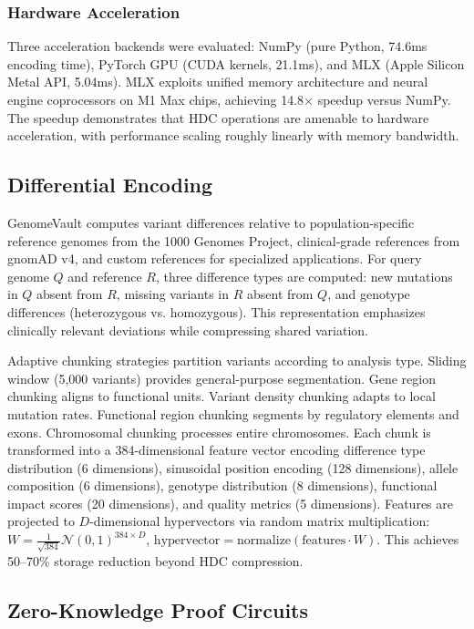 \documentclass[11pt,letterpaper]{article}
\begin{document}
\subsubsection{Hardware Acceleration}

Three acceleration backends were evaluated: NumPy (pure Python, 74.6ms encoding time), PyTorch GPU (CUDA kernels, 21.1ms), and MLX (Apple Silicon Metal API, 5.04ms). MLX exploits unified memory architecture and neural engine coprocessors on M1 Max chips, achieving 14.8$\times$ speedup versus NumPy. The speedup demonstrates that HDC operations are amenable to hardware acceleration, with performance scaling roughly linearly with memory bandwidth.

\subsection{Differential Encoding}

GenomeVault computes variant differences relative to population-specific reference genomes from the 1000 Genomes Project, clinical-grade references from gnomAD v4, and custom references for specialized applications. For query genome $Q$ and reference $R$, three difference types are computed: new mutations in $Q$ absent from $R$, missing variants in $R$ absent from $Q$, and genotype differences (heterozygous vs. homozygous). This representation emphasizes clinically relevant deviations while compressing shared variation.

Adaptive chunking strategies partition variants according to analysis type. Sliding window (5,000 variants) provides general-purpose segmentation. Gene region chunking aligns to functional units. Variant density chunking adapts to local mutation rates. Functional region chunking segments by regulatory elements and exons. Chromosomal chunking processes entire chromosomes. Each chunk is transformed into a 384-dimensional feature vector encoding difference type distribution (6 dimensions), sinusoidal position encoding (128 dimensions), allele composition (6 dimensions), genotype distribution (8 dimensions), functional impact scores (20 dimensions), and quality metrics (5 dimensions). Features are projected to $D$-dimensional hypervectors via random matrix multiplication: $W = \frac{1}{\sqrt{384}} \mathcal{N}(0, 1)^{384 \times D}$, $\text{hypervector} = \text{normalize}(\text{features} \cdot W)$. This achieves 50--70\% storage reduction beyond HDC compression.

\subsection{Zero-Knowledge Proof Circuits}
\end{document}
